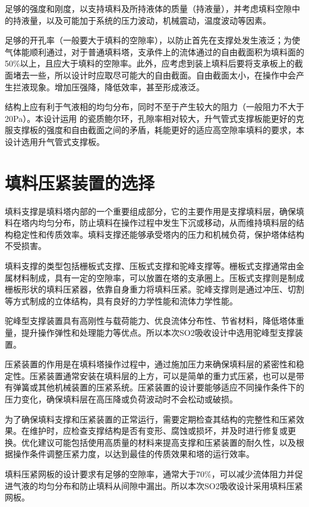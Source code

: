 足够的强度和刚度，以支持填料及所持液体的质量（持液量），并考虑填料空隙中的持液量，以及可能加于系统的压力波动，机械震动，温度波动等因素。

足够的开孔率（一般要大于填料的空隙率），以防止首先在支撑处发生液泛；为使气体能顺利通过，对于普通填料塔，支承件上的流体通过的自由截面积为填料面的50\%以上，且应大于填料的空隙率。此外，应考虑到装上填料后要将支承板上的截面堵去一些，所以设计时应取尽可能大的自由截面。自由截面太小，在操作中会产生拦液现象。增加压强降，降低效率，甚至形成液泛。

结构上应有利于气液相的均匀分布，同时不至于产生较大的阻力（一般阻力不大于20Pa）。本设计运用 的瓷质鲍尔环，孔隙率相对较大，升气管式支撑板能更好的克服支撑板的强度和自由截面之间的矛盾，耗能更好的适应高空隙率填料的要求，本设计选用升气管式支撑板。



\section{填料压紧装置的选择}
填料支撑是填料塔内部的一个重要组成部分，它的主要作用是支撑填料层，确保填料在塔内均匀分布，防止填料在操作过程中发生下沉或移动，从而维持填料层的结构稳定性和传质效率。填料支撑还能够承受塔内的压力和机械负荷，保护塔体结构不受损害。

填料支撑的类型包括栅板式支撑、压板式支撑和驼峰支撑等。栅板式支撑通常由金属材料制成，具有一定的空隙率，可以放置在塔的支承圈上。压板式支撑则是制成栅板形状的填料压紧器，依靠自身重力将填料压紧。驼峰支撑则是通过冲压、切割等方式制成的立体结构，具有良好的力学性能和流体力学性能。

驼峰型支撑装置具有高刚性与载荷能力、优良流体分布性、节省材料，降低塔体重量，提升操作弹性和处理能力等优点。所以本次SO2吸收设计中选用驼峰型支撑装置。

压紧装置的作用是在填料塔操作过程中，通过施加压力来确保填料层的紧密性和稳定性。压紧装置通常安装在填料层的上方，可以是简单的重力式压紧，也可以是带有弹簧或其他机械装置的压紧系统。压紧装置的设计要能够适应不同操作条件下的压力变化，确保填料层在高压降或负荷波动时不会松动或破损。

为了确保填料支撑和压紧装置的正常运行，需要定期检查其结构的完整性和压紧效果。在维护时，应检查支撑结构是否有变形、腐蚀或损坏，并及时进行修复或更换。优化建议可能包括使用高质量的材料来提高支撑和压紧装置的耐久性，以及根据操作条件调整压紧力度，以达到最佳的传质效果和塔的运行效率。

填料压紧网板的设计要求有足够的空隙率，通常大于70\%，可以减少流体阻力并促进气液的均匀分布和防止填料从间隙中漏出。所以本次SO2吸收设计采用填料压紧网板。